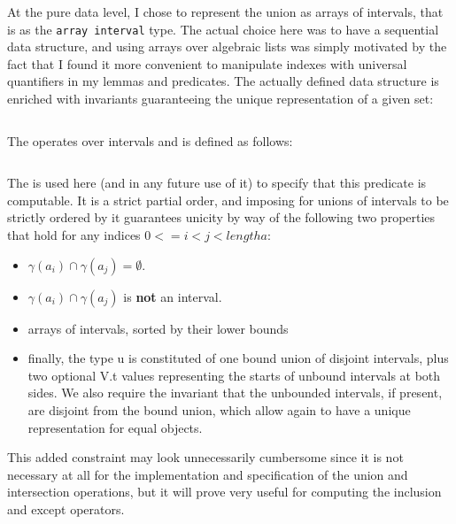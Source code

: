 At the pure data level, I chose to represent the union as arrays of intervals, that
is as the \texttt{array interval} type.
%
The actual choice here was to have a sequential data structure, and using
arrays over algebraic lists was simply motivated by the fact that I found it more
convenient to manipulate indexes with universal quantifiers in my lemmas and predicates.
%
The actually defined data structure is enriched with invariants guaranteeing the
unique representation of a given set:
%
\inputminted{\whyml}{why3code/bound_union_type.mlw}
The \minline{(<<)} operates over intervals and is defined as follows:
%
\inputminted{\whyml}{why3code/before_interval_pred.mlw}
%
The  is used here (and in any future use of it) to specify that this
predicate is computable.
%
It is a strict partial order, and imposing for unions of intervals to be strictly
ordered by it guarantees unicity by way of the following two properties that hold for
any indices $0 <= i < j < length a$:
%
\begin{itemize}
  \item $\gamma(a_i) \cap \gamma(a_j) = \emptyset$.
  \item $\gamma(a_i) \cap \gamma(a_j)$ is \textbf{not} an interval.
\end{itemize}



\begin{itemize}
    \item arrays of intervals, sorted by their lower bounds
  \item finally, the type u is constituted of one bound union of disjoint intervals,
    plus two optional V.t values representing the starts of unbound intervals at both
    sides. We also require the invariant that the unbounded intervals, if present,
    are disjoint from the bound union, which allow again to have a unique
    representation for equal objects.
\end{itemize}


%
This added constraint may look unnecessarily cumbersome since it is not necessary at
all for the implementation and specification of the union and intersection
operations, but it will prove very useful for computing the inclusion and except
operators.
